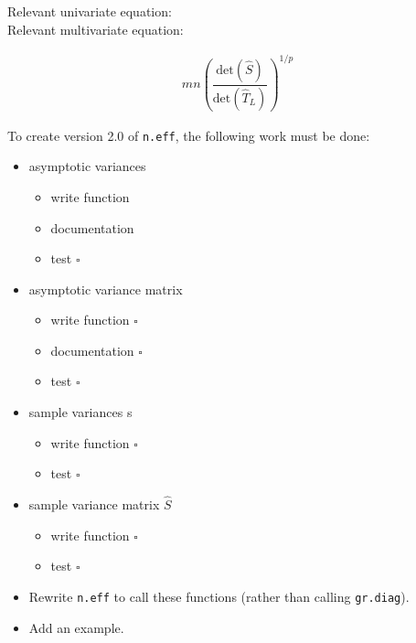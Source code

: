 \documentclass[12pt]{article}
\theoremstyle{remark}
\begin{document}
Relevant univariate equation: \\

Relevant multivariate equation:

\begin{align*}
m n \left( \dfrac{\text{det}(\hat{S})}{\text{det}(\hat{T}_L)} \right)^{1/p}
\end{align*}

To create version 2.0 of \texttt{n.eff}, the following work must be done:

\begin{itemize}
 \renewcommand{\labelitemi}{$\square$}
\item  asymptotic variances
\begin{itemize}
\item write function \checkmark
\item documentation \checkmark
\item test $\square$
\end{itemize}

\item  asymptotic variance matrix
\begin{itemize}
\item write function $\square$
\item documentation $\square$
\item test $\square$
\end{itemize}

\item  sample variances s
\begin{itemize}
\item write function $\square$
\item test $\square$
\end{itemize}


\item  sample variance matrix $\hat{S}$
\begin{itemize}
\item write function $\square$
\item test $\square$
\end{itemize}



\item Rewrite \texttt{n.eff} to call these functions (rather than calling \texttt{gr.diag}).

\item Add an example.

\end{itemize}
\end{document}
